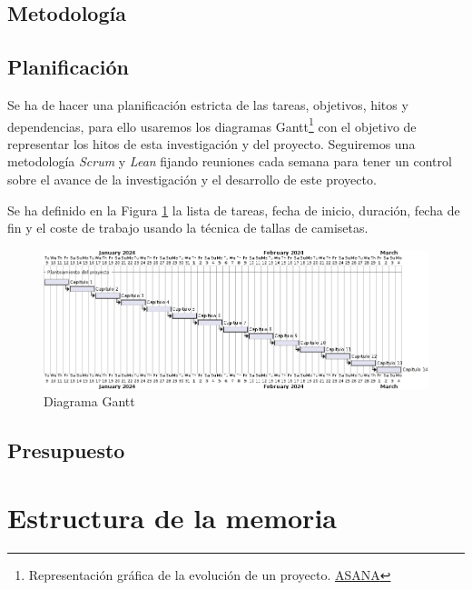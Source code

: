 
\subsection{Metodología}


\subsection{Planificación}

Se ha de hacer una planificación estricta de las tareas, objetivos, hitos y dependencias, para ello usaremos los diagramas Gantt\footnote{Representación gráfica de la evolución de un proyecto. \href{https://asana.com/es/resources/gantt-chart-basics}{ASANA}} con el objetivo de representar los hitos de esta investigación y del proyecto.
Seguiremos una metodología \textit{Scrum} y \textit{Lean} fijando reuniones cada semana para tener un control sobre el avance de la investigación y el desarrollo de este proyecto.

Se ha definido en la Figura \ref{fig:gantt} la lista de tareas, fecha de inicio, duración, fecha de fin y el coste de trabajo usando la técnica de tallas de camisetas.


\begin{figure}[H]
    \centering
    \includegraphics[width=1\linewidth]{figures/chapter01/Gantt.png}
    \caption{Diagrama Gantt}
    \label{fig:gantt}
\end{figure}

\subsection{Presupuesto}



\section{Estructura de la memoria}

